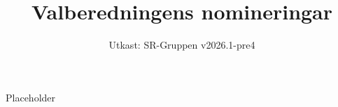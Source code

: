 \documentclass[a4paper]{dtek}
\title{Valberedningens nomineringar}
\date{Utkast: SR-Gruppen v2026.1-pre4}
\begin{document}
Placeholder
\end{document}
